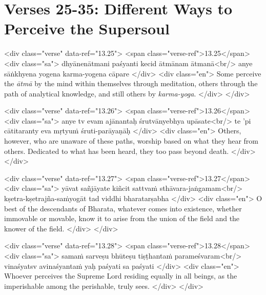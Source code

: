 \section{Verses 25-35: Different Ways to Perceive the Supersoul}\label{sec-verses-25-35-different-ways-to-perceive-the-supersoul}


\begin{html}
<div class="verse" data-ref="13.25">
  <span class="verse-ref">13.25</span>
  <div class="sa">
    dhyānenātmani paśyanti kecid ātmānam ātmanā<br/>
    anye sāṅkhyena yogena karma-yogena cāpare
  </div>
  <div class="en">
    Some perceive the \textit{ātmā} by the mind within themselves through meditation, others through the path of analytical knowledge, and still others by \textit{karma-yoga}.
  </div>
</div>
\end{html}



\begin{html}
<div class="verse" data-ref="13.26">
  <span class="verse-ref">13.26</span>
  <div class="sa">
    anye tv evam ajānantaḥ śrutvānyebhya upāsate<br/>
    te ’pi cātitaranty eva mṛtyuṁ śruti-parāyaṇāḥ
  </div>
  <div class="en">
    Others, however, who are unaware of these paths, worship based on what they hear from others. Dedicated to what has been heard, they too pass beyond death.
  </div>
</div>
\end{html}



\begin{html}
<div class="verse" data-ref="13.27">
  <span class="verse-ref">13.27</span>
  <div class="sa">
    yāvat sañjāyate kiñcit sattvaṁ sthāvara-jaṅgamam<br/>
    kṣetra-kṣetrajña-saṁyogāt tad viddhi bharatarṣabha
  </div>
  <div class="en">
    O best of the descendants of Bharata, whatever comes into existence, whether immovable or movable, know it to arise from the union of the field and the knower of the field.
  </div>
</div>
\end{html}



\begin{html}
<div class="verse" data-ref="13.28">
  <span class="verse-ref">13.28</span>
  <div class="sa">
    samaṁ sarveṣu bhūteṣu tiṣṭhantaṁ parameśvaram<br/>
    vinaśyatsv avinaśyantaṁ yaḥ paśyati sa paśyati
  </div>
  <div class="en">
    Whoever perceives the Supreme Lord residing equally in all beings, as the imperishable among the perishable, truly sees.
  </div>
</div>
\end{html}



